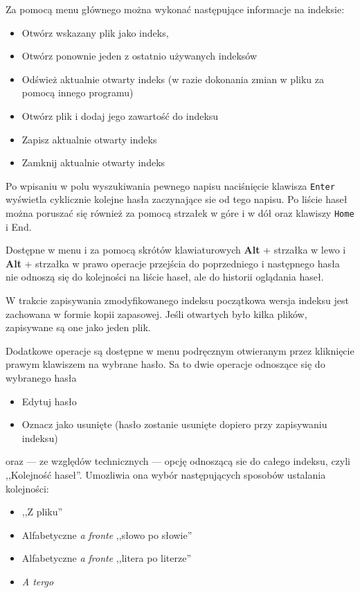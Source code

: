 \documentclass{mwart}
\def\key#1{\textbf{#1}}
\begin{document}
Za pomocą menu głównego można wykonać następujące informacje na
indeksie:
\begin{itemize}
\item Otwórz wskazany plik jako indeks,
\item Otwórz ponownie jeden z ostatnio używanych indeksów
\item Odśwież aktualnie otwarty indeks (w razie dokonania zmian w
  pliku za pomocą innego programu)
\item Otwórz plik i dodaj jego zawartość do indeksu
\item Zapisz aktualnie otwarty indeks
\item Zamknij aktualnie otwarty indeks
\end{itemize} 

Po wpisaniu w polu wyszukiwania pewnego napisu naciśnięcie klawisza
\texttt{Enter} wyświetla cyklicznie kolejne hasła zaczynające sie od
tego napisu. Po liście haseł można poruszać się również za pomocą
strzałek w góre i w dół oraz klawiszy \texttt{Home} i \textup{End}.

Dostępne w menu i za pomocą skrótów klawiaturowych \key{Alt} +
strzałka w lewo i \key{Alt} + strzałka w prawo operacje przejścia do
poprzedniego i następnego hasła nie odnoszą się do kolejności na
liście haseł, ale do historii oglądania haseł.

W trakcie zapisywania zmodyfikowanego indeksu początkowa wersja
indeksu jest zachowana w formie kopii zapasowej. Jeśli otwartych było
kilka plików, zapisywane są one jako jeden plik.

Dodatkowe operacje są dostępne w menu podręcznym otwieranym przez
kliknięcie prawym klawiszem na wybrane hasło. Sa to dwie operacje
odnoszące się do wybranego hasła
\begin{itemize}
\item Edytuj hasło
\item Oznacz jako usunięte (hasło zostanie usunięte dopiero przy
  zapisywaniu indeksu)
\end{itemize}
oraz --- ze względów technicznych --- opcję odnoszącą sie do całego
indeksu, czyli ,,Kolejność haseł''. Umozliwia ona wybór następujących
sposobów ustalania kolejności:
\begin{itemize}
\item ,,Z pliku''
\item  Alfabetyczne \textit{a fronte} ,,słowo po słowie''
\item Alfabetyczne \textit{a fronte} ,,litera po literze''
\item \textit{A tergo}
\end{itemize}
\end{document}
